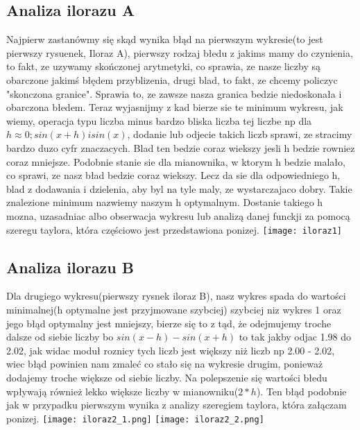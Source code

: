 \documentclass[12pt]{article}
\begin{document}
\subsection{Analiza ilorazu A}
Najpierw zastanówmy się skąd wynika błąd na pierwszym wykresie(to jest pierwszy rysuenek, Iloraz A), pierwszy rodzaj błedu z jakims mamy do czynienia, to fakt, ze uzywamy skończonej arytmetyki, co sprawia, ze nasze liczby są obarczone jakimś błędem przyblizenia, drugi blad, to fakt, ze chcemy policzyc "skonczona granice". Sprawia to, ze zawsze nasza granica bedzie niedoskonała i obarczona błedem. Teraz wyjasnijmy z kad bierze sie te minimum wykresu, jak wiemy, operacja typu liczba minus bardzo bliska liczba tej liczbe np dla $h \approx 0; sin(x+h) i sin(x)$, dodanie lub odjecie takich liczb sprawi, ze stracimy bardzo duzo cyfr znaczacych. Blad ten bedzie coraz wiekszy jesli h bedzie rowniez coraz mniejsze. Podobnie stanie sie dla mianownika, w ktorym h bedzie malało, co sprawi, ze nasz bład bedzie coraz wiekszy. Lecz da sie dla odpowiedniego h, blad z dodawania i dzielenia, aby byl na tyle maly, ze wystarczajaco dobry. Takie znalezione minimum nazwiemy naszym h optymalnym. Dostanie takiego h mozna, uzasadniac albo obserwacja wykresu lub analizą danej funckji za pomocą szeregu taylora, która częściowo jest przedstawiona ponizej.
\newline
\newline
\texttt{[image: iloraz1]}
\newline
\newline
\subsection{Analiza ilorazu B}
Dla drugiego wykresu(pierwszy rysnek iloraz B), nasz wykres spada do wartości minimalnej(h optymalne jest przyjmowane szybciej) szybciej niz wykres 1 oraz jego błąd optymalny jest mniejszy, bierze się to z tąd, że odejmujemy troche dalsze od siebie liczby bo $sin(x-h) - sin(x+h)$ to tak jakby odjac 1.98 do 2.02, jak widac moduł roznicy tych liczb jest większy niż liczb np 2.00 - 2.02, wiec błąd powinien nam zmaleć co stało się na wykresie drugim, ponieważ dodajemy troche większe od siebie liczby. Na polepszenie się wartości błedu wpływają również lekko większe liczby w mianowniku($2*h$). Ten błąd podobnie jak w przypadku pierwszym wynika z analizy szeregiem taylora, która załączam ponizej.
\newline
\newline
\texttt{[image: iloraz2\_1.png]}
\texttt{[image: iloraz2\_2.png]}
\newline
\newline
\end{document}
